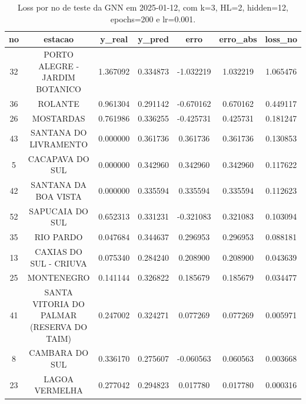 \begin{table}[h]
\centering
\caption{Loss por no de teste da GNN em 2025-01-12, com k=3, HL=2, hidden=12, epochs=200 e lr=0.001.}
\label{tab:gnn_loss_k3_hl2_h12_e200_d20250112}
\begin{tabular}{ccccccc}
\toprule
no & estacao & y\_real & y\_pred & erro & erro\_abs & loss\_no \\
\midrule
32 & PORTO ALEGRE - JARDIM BOTANICO & 1.367092 & 0.334873 & -1.032219 & 1.032219 & 1.065476 \\
36 & ROLANTE & 0.961304 & 0.291142 & -0.670162 & 0.670162 & 0.449117 \\
26 & MOSTARDAS & 0.761986 & 0.336255 & -0.425731 & 0.425731 & 0.181247 \\
43 & SANTANA DO LIVRAMENTO & 0.000000 & 0.361736 & 0.361736 & 0.361736 & 0.130853 \\
5 & CACAPAVA DO SUL & 0.000000 & 0.342960 & 0.342960 & 0.342960 & 0.117622 \\
42 & SANTANA DA BOA VISTA & 0.000000 & 0.335594 & 0.335594 & 0.335594 & 0.112623 \\
52 & SAPUCAIA DO SUL & 0.652313 & 0.331231 & -0.321083 & 0.321083 & 0.103094 \\
35 & RIO PARDO & 0.047684 & 0.344637 & 0.296953 & 0.296953 & 0.088181 \\
13 & CAXIAS DO SUL - CRIUVA & 0.075340 & 0.284240 & 0.208900 & 0.208900 & 0.043639 \\
25 & MONTENEGRO & 0.141144 & 0.326822 & 0.185679 & 0.185679 & 0.034477 \\
41 & SANTA VITORIA DO PALMAR (RESERVA DO TAIM) & 0.247002 & 0.324271 & 0.077269 & 0.077269 & 0.005971 \\
8 & CAMBARA DO SUL & 0.336170 & 0.275607 & -0.060563 & 0.060563 & 0.003668 \\
23 & LAGOA VERMELHA & 0.277042 & 0.294823 & 0.017780 & 0.017780 & 0.000316 \\
\bottomrule
\end{tabular}
\end{table}
